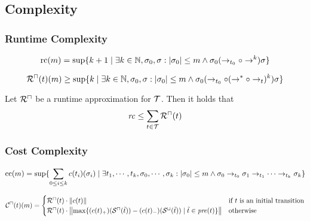 \subsection{Complexity}

\subsubsection{Runtime Complexity}

\begin{definition}
	\[ \text{rc}(m) = \sup \lbrace  k + 1 \mid \exists k \in \mathbb{N}, \sigma_0, \sigma: \left|\sigma_0\right| \leq m \wedge \sigma_0 (\rightarrow_{t_0} \circ \rightarrow^k) \sigma  \rbrace \]
\end{definition}

\begin{definition}
	\[ {\mathcal{R}^\sqcap}(t)(m) \geq \sup \lbrace  k \mid \exists k \in \mathbb{N}, \sigma_0, \sigma: \left|\sigma_0\right| \leq m \wedge \sigma_0 (\rightarrow_{t_0} \circ (\rightarrow^* \circ \rightarrow_t)^k) \sigma  \rbrace \]
\end{definition}

\begin{theorem}
	Let ${\mathcal{R}^\sqcap}$ be a runtime approximation for $\mathcal{T}$.
	Then it holds that 
	\[ \mathit{rc} \leq \sum_{t \in \mathcal{T}}{\mathcal{R}^\sqcap}(t) \]
\end{theorem}

\subsubsection{Cost Complexity}

\begin{definition}
  \[ \text{cc}(m) = \sup \lbrace  \sum_{0 \leq i \leq k} c(t_i)(\sigma_i) \mid \exists t_1, \cdots, t_k, \sigma_0, \cdots, \sigma_k: \left|\sigma_0\right| \leq m \wedge
    \sigma_0 \rightarrow_{t_0} \sigma_1 \rightarrow_{t_1} \dots \rightarrow_{t_k} \sigma_k  \rbrace
  \]
\end{definition}

\begin{definition}
  \[ {\mathcal{C}^\sqcap}(t)(m) =
  \begin{cases}
    {\mathcal{R}^\sqcap}(t) \cdot \left\Vert c(t)\right\Vert & \text{if } t \text{ is an initial transition} \\
    {\mathcal{R}^\sqcap}(t) \cdot \left\Vert\max \lbrace (c(t)_+)({\mathcal{S}^\sqcap}(\tilde{t})) - (c(t)_-)({\mathcal{S}^\sqcup}(\tilde{t})) \mid \tilde{t} \in \mathit{pre}(t) \rbrace\right\Vert & \text{otherwise}
  \end{cases}
  \]
\end{definition}

